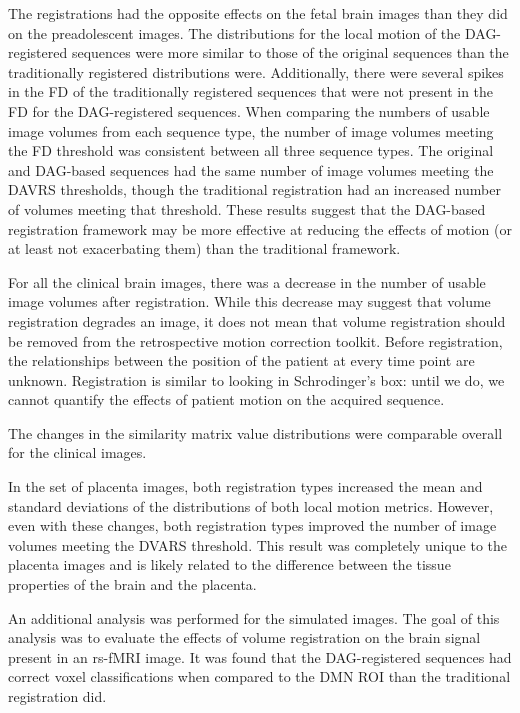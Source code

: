 The registrations had the opposite effects on the fetal brain images than they did on the preadolescent images. The distributions for the local motion of the DAG-registered sequences were more similar to those of the original sequences than the traditionally registered distributions were. Additionally, there were several spikes in the FD of the traditionally registered sequences that were not present in the FD for the DAG-registered sequences. When comparing the numbers of usable image volumes from each sequence type, the number of image volumes meeting the FD threshold was consistent between all three sequence types. The original and DAG-based sequences had the same number of image volumes meeting the DAVRS thresholds, though the traditional registration had an increased number of volumes meeting that threshold. These results suggest that the DAG-based registration framework may be more effective at reducing the effects of motion (or at least not exacerbating them) than the traditional framework.

For all the clinical brain images, there was a decrease in the number of usable image volumes after registration. While this decrease may suggest that volume registration degrades an image, it does not mean that volume registration should be removed from the retrospective motion correction toolkit. Before registration, the relationships between the position of the patient at every time point are unknown. Registration is similar to looking in Schrodinger's box: until we do, we cannot quantify the effects of patient motion on the acquired sequence.

The changes in the similarity matrix value distributions were comparable overall for the clinical images.

In the set of placenta images, both registration types increased the mean and standard deviations of the distributions of both local motion metrics. However, even with these changes, both registration types improved the number of image volumes meeting the DVARS threshold. This result was completely unique to the placenta images and is likely related to the difference between the tissue properties of the brain and the placenta.

An additional analysis was performed for the simulated images. The goal of this analysis was to evaluate the effects of volume registration on the brain signal present in an rs-fMRI image. It was found that the DAG-registered sequences had correct voxel classifications when compared to the DMN ROI than the traditional registration did. 

